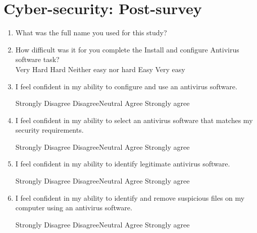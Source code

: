 \chapter{Cyber-security: Post-survey}
\label{apx:cypost}
\begin{enumerate}[noitemsep]
\item What was the full name you used for this study?
\item How difficult was it for you complete the Install and configure Antivirus software task?\\
Very Hard \hspace{1cm} Hard \hspace{1cm} Neither easy nor hard \hspace{1cm} Easy \hspace{1cm} Very easy 
\item I feel confident in my ability to configure and use an antivirus software.
\par Strongly Disagree \hspace{1cm} Disagree\hspace{1cm}Neutral\hspace{1cm} Agree\hspace{1cm} Strongly agree
\item I feel confident in my ability to select an antivirus software that matches my security requirements.
\par Strongly Disagree \hspace{1cm} Disagree\hspace{1cm}Neutral\hspace{1cm} Agree\hspace{1cm} Strongly agree
\item I feel confident in my ability to identify legitimate antivirus software.
\par Strongly Disagree \hspace{1cm} Disagree\hspace{1cm}Neutral\hspace{1cm} Agree\hspace{1cm} Strongly agree
\item I feel confident in my ability to identify and remove suspicious files on my computer using an antivirus software.
\par Strongly Disagree \hspace{1cm} Disagree\hspace{1cm}Neutral\hspace{1cm} Agree\hspace{1cm} Strongly agree

\end{enumerate}

